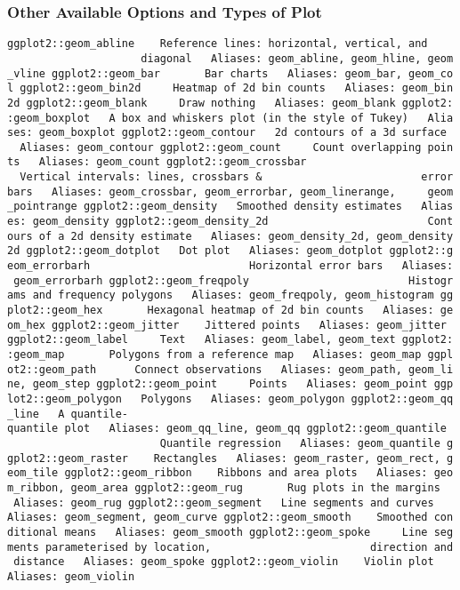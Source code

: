 \documentclass[11pt]{article}
\begin{document}
    \subsubsection{Other Available Options and Types of
Plot}\label{other-available-options-and-types-of-plot}

\texttt{ggplot2::geom\_abline\ \ \ \ Reference\ lines:\ horizontal,\ vertical,\ and\ \ \ \ \ \ \ \ \ \ \ \ \ \ \ \ \ \ \ \ \ \ \ \ \ diagonal\ \ \ Aliases:\ geom\_abline,\ geom\_hline,\ geom\_vline\ ggplot2::geom\_bar\ \ \ \ \ \ \ Bar\ charts\ \ \ Aliases:\ geom\_bar,\ geom\_col\ ggplot2::geom\_bin2d\ \ \ \ \ Heatmap\ of\ 2d\ bin\ counts\ \ \ Aliases:\ geom\_bin2d\ ggplot2::geom\_blank\ \ \ \ \ Draw\ nothing\ \ \ Aliases:\ geom\_blank\ ggplot2::geom\_boxplot\ \ \ A\ box\ and\ whiskers\ plot\ (in\ the\ style\ of\ Tukey)\ \ \ Aliases:\ geom\_boxplot\ ggplot2::geom\_contour\ \ \ 2d\ contours\ of\ a\ 3d\ surface\ \ \ Aliases:\ geom\_contour\ ggplot2::geom\_count\ \ \ \ \ Count\ overlapping\ points\ \ \ Aliases:\ geom\_count\ ggplot2::geom\_crossbar\ \ \ \ \ \ \ \ \ \ \ \ \ \ \ \ \ \ \ \ \ \ \ \ \ Vertical\ intervals:\ lines,\ crossbars\ \&\ \ \ \ \ \ \ \ \ \ \ \ \ \ \ \ \ \ \ \ \ \ \ \ \ errorbars\ \ \ Aliases:\ geom\_crossbar,\ geom\_errorbar,\ geom\_linerange,\ \ \ \ \ geom\_pointrange\ ggplot2::geom\_density\ \ \ Smoothed\ density\ estimates\ \ \ Aliases:\ geom\_density\ ggplot2::geom\_density\_2d\ \ \ \ \ \ \ \ \ \ \ \ \ \ \ \ \ \ \ \ \ \ \ \ \ Contours\ of\ a\ 2d\ density\ estimate\ \ \ Aliases:\ geom\_density\_2d,\ geom\_density2d\ ggplot2::geom\_dotplot\ \ \ Dot\ plot\ \ \ Aliases:\ geom\_dotplot\ ggplot2::geom\_errorbarh\ \ \ \ \ \ \ \ \ \ \ \ \ \ \ \ \ \ \ \ \ \ \ \ \ Horizontal\ error\ bars\ \ \ Aliases:\ geom\_errorbarh\ ggplot2::geom\_freqpoly\ \ \ \ \ \ \ \ \ \ \ \ \ \ \ \ \ \ \ \ \ \ \ \ \ Histograms\ and\ frequency\ polygons\ \ \ Aliases:\ geom\_freqpoly,\ geom\_histogram\ ggplot2::geom\_hex\ \ \ \ \ \ \ Hexagonal\ heatmap\ of\ 2d\ bin\ counts\ \ \ Aliases:\ geom\_hex\ ggplot2::geom\_jitter\ \ \ \ Jittered\ points\ \ \ Aliases:\ geom\_jitter\ ggplot2::geom\_label\ \ \ \ \ Text\ \ \ Aliases:\ geom\_label,\ geom\_text\ ggplot2::geom\_map\ \ \ \ \ \ \ Polygons\ from\ a\ reference\ map\ \ \ Aliases:\ geom\_map\ ggplot2::geom\_path\ \ \ \ \ \ Connect\ observations\ \ \ Aliases:\ geom\_path,\ geom\_line,\ geom\_step\ ggplot2::geom\_point\ \ \ \ \ Points\ \ \ Aliases:\ geom\_point\ ggplot2::geom\_polygon\ \ \ Polygons\ \ \ Aliases:\ geom\_polygon\ ggplot2::geom\_qq\_line\ \ \ A\ quantile-quantile\ plot\ \ \ Aliases:\ geom\_qq\_line,\ geom\_qq\ ggplot2::geom\_quantile\ \ \ \ \ \ \ \ \ \ \ \ \ \ \ \ \ \ \ \ \ \ \ \ \ Quantile\ regression\ \ \ Aliases:\ geom\_quantile\ ggplot2::geom\_raster\ \ \ \ Rectangles\ \ \ Aliases:\ geom\_raster,\ geom\_rect,\ geom\_tile\ ggplot2::geom\_ribbon\ \ \ \ Ribbons\ and\ area\ plots\ \ \ Aliases:\ geom\_ribbon,\ geom\_area\ ggplot2::geom\_rug\ \ \ \ \ \ \ Rug\ plots\ in\ the\ margins\ \ \ Aliases:\ geom\_rug\ ggplot2::geom\_segment\ \ \ Line\ segments\ and\ curves\ \ \ Aliases:\ geom\_segment,\ geom\_curve\ ggplot2::geom\_smooth\ \ \ \ Smoothed\ conditional\ means\ \ \ Aliases:\ geom\_smooth\ ggplot2::geom\_spoke\ \ \ \ \ Line\ segments\ parameterised\ by\ location,\ \ \ \ \ \ \ \ \ \ \ \ \ \ \ \ \ \ \ \ \ \ \ \ \ direction\ and\ distance\ \ \ Aliases:\ geom\_spoke\ ggplot2::geom\_violin\ \ \ \ Violin\ plot\ \ \ Aliases:\ geom\_violin}


    
    
    
    
\end{document}
